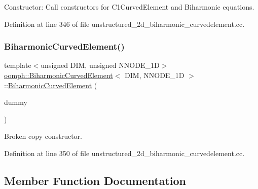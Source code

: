 Constructor\+: Call constructors for C1\+Curved\+Element and Biharmonic equations. 



Definition at line 346 of file unstructured\+\_\+2d\+\_\+biharmonic\+\_\+curvedelement.\+cc.

\mbox{\label{classoomph_1_1BiharmonicCurvedElement_a20723b0ce340d7ddb7823f83c3d504ee}} 
\subsubsection{\texorpdfstring{Biharmonic\+Curved\+Element()}{BiharmonicCurvedElement()}\hspace{0.1cm}{\footnotesize\ttfamily [2/2]}}
{\footnotesize\ttfamily template$<$unsigned D\+IM, unsigned N\+N\+O\+D\+E\+\_\+1D$>$ \\
\hyperlink{classoomph_1_1BiharmonicCurvedElement}{oomph\+::\+Biharmonic\+Curved\+Element}$<$ D\+IM, N\+N\+O\+D\+E\+\_\+1D $>$\+::\hyperlink{classoomph_1_1BiharmonicCurvedElement}{Biharmonic\+Curved\+Element} (\begin{DoxyParamCaption}\item[{const \hyperlink{classoomph_1_1BiharmonicCurvedElement}{Biharmonic\+Curved\+Element}$<$ D\+IM, N\+N\+O\+D\+E\+\_\+1D $>$ \&}]{dummy }\end{DoxyParamCaption})\hspace{0.3cm}{\ttfamily [inline]}}



Broken copy constructor. 



Definition at line 350 of file unstructured\+\_\+2d\+\_\+biharmonic\+\_\+curvedelement.\+cc.



\subsection{Member Function Documentation}
\mbox{\label{classoomph_1_1BiharmonicCurvedElement_a89720b99d24708f02135502625ad7e3c}} 
